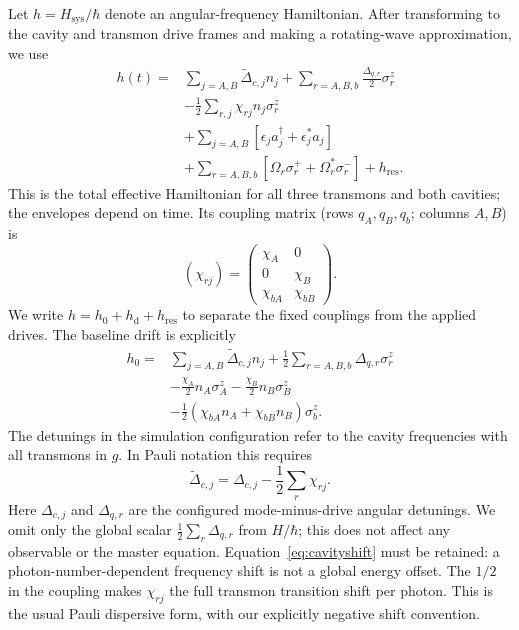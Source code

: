 \documentclass[aps,prb,reprint,amsmath,amssymb,nofootinbib]{revtex4-2}
\begin{document}
Let $h=H_{\mathrm{sys}}/\hbar$ denote an angular-frequency Hamiltonian.
After transforming to the cavity and transmon drive frames and making a
rotating-wave approximation, we use
\begin{equation}
 \boxed{\begin{aligned}
 h(t)={}&\sum_{j=A,B}\widetilde\Delta_{c,j}n_j
       +\sum_{r=A,B,b}\frac{\Delta_{q,r}}2\sigma_r^z\\
 &-\frac12\sum_{r,j}\chi_{rj}n_j\sigma_r^z\\
 &+\sum_{j=A,B}[\epsilon_j a_j^\dagger+\epsilon_j^*a_j]\\
 &+\sum_{r=A,B,b}[\Omega_r\sigma_r^++\Omega_r^*\sigma_r^-]
       +h_{\mathrm{res}} .
 \end{aligned}}
 \label{eq:system}
\end{equation}
This is the total effective Hamiltonian for all three transmons and both
cavities; the envelopes depend on time. Its coupling matrix (rows
$q_A,q_B,q_b$; columns $A,B$) is
\begin{equation}
 (\chi_{rj})=\begin{pmatrix}
 \chi_A&0\\0&\chi_B\\\chi_{bA}&\chi_{bB}
 \end{pmatrix}.
\end{equation}
We write $h=h_0+h_{\mathrm d}+h_{\mathrm{res}}$ to separate the fixed
couplings from the applied drives.
The baseline drift is explicitly
\begin{align}
 h_0={}&\sum_{j=A,B}\widetilde\Delta_{c,j}n_j
       +\frac12\sum_{r=A,B,b}\Delta_{q,r}\sigma_r^z\nonumber\\
     &-\frac{\chi_A}{2}n_A\sigma_A^z
      -\frac{\chi_B}{2}n_B\sigma_B^z\nonumber\\
     &-\frac12(\chi_{bA}n_A+\chi_{bB}n_B)\sigma_b^z .
 \label{eq:drift}
\end{align}
The detunings in the simulation configuration refer to the cavity
frequencies with all transmons in $g$. In Pauli notation this requires
\begin{equation}
 \widetilde\Delta_{c,j}=\Delta_{c,j}-\frac12\sum_r\chi_{rj}.
 \label{eq:cavityshift}
\end{equation}
Here $\Delta_{c,j}$ and $\Delta_{q,r}$ are the configured mode-minus-drive
angular detunings. We omit only the global scalar
$\frac12\sum_r\Delta_{q,r}$ from $H/\hbar$; this does not affect any
observable or the master equation. Equation~\eqref{eq:cavityshift} must
be retained: a photon-number-dependent frequency shift is not a global
energy offset. The $1/2$ in the coupling makes $\chi_{rj}$ the full
transmon transition shift per photon. This is the usual Pauli dispersive
form, with our explicitly negative shift convention.\cite{Blais2021}
\end{document}
